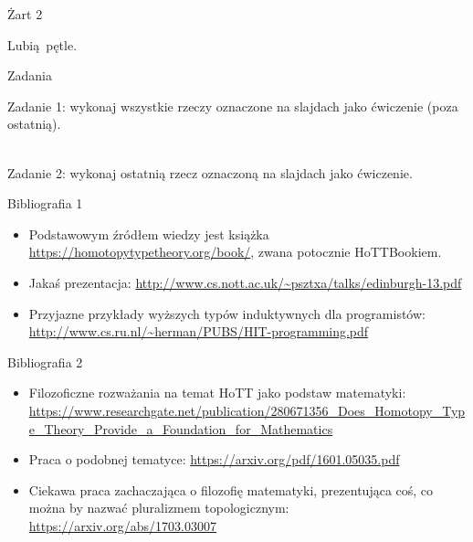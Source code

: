 \documentclass{beamer}
\begin{document}
\begin{frame}{Żart 2}

Lubią pętle.

\end{frame}

\begin{frame}{Zadania}

Zadanie 1: wykonaj wszystkie rzeczy oznaczone na slajdach jako ćwiczenie (poza ostatnią). \\~\

Zadanie 2: wykonaj ostatnią rzecz oznaczoną na slajdach jako ćwiczenie.

\end{frame}

\begin{frame}{Bibliografia 1}
\begin{itemize}
	\item Podstawowym źródłem wiedzy jest książka \url{https://homotopytypetheory.org/book/}, zwana potocznie HoTTBookiem.
	\item Jakaś prezentacja: \url{http://www.cs.nott.ac.uk/~psztxa/talks/edinburgh-13.pdf}
	\item Przyjazne przykłady wyższych typów induktywnych dla programistów: \url{http://www.cs.ru.nl/~herman/PUBS/HIT-programming.pdf}
\end{itemize}
\end{frame}

\begin{frame}{Bibliografia 2}
\begin{itemize}
	\item Filozoficzne rozważania na temat HoTT jako podstaw matematyki: \url{https://www.researchgate.net/publication/280671356_Does_Homotopy_Type_Theory_Provide_a_Foundation_for_Mathematics}
	\item Praca o podobnej tematyce: \url{https://arxiv.org/pdf/1601.05035.pdf}
	\item Ciekawa praca zachaczająca o filozofię matematyki, prezentująca coś, co można by nazwać pluralizmem topologicznym: \url{https://arxiv.org/abs/1703.03007}
\end{itemize}
\end{frame}
\end{document}
